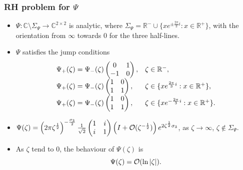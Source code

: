 \documentclass[11pt,fleqn]{article}
\numberwithin{equation}{section}
\def\bigO{{\cal O}}
\begin{document}
\subsubsection*{RH problem for $\Psi$}

\begin{itemize}
\item[(a)] $\Psi : \mathbb{C} \setminus \Sigma_{\Psi} \to \mathbb{C}^{2\times 2}$ is analytic, where $\Sigma_{\Psi} = \mathbb{R}^{-} \cup \{ xe^{\pm\frac{2\pi }{3}i} : x \in \mathbb{R}^{+} \}$, with the orientation from $\infty$ towards $0$ for the three half-lines.
\item[(b)] $\Psi$ satisfies the jump conditions
\begin{equation*}
\begin{array}{l l}
\Psi_{+}(\zeta) = \Psi_{-}(\zeta) \begin{pmatrix}
0 & 1 \\ -1 & 0
\end{pmatrix}, & \zeta \in \mathbb{R}^{-}, \\

\Psi_{+}(\zeta) = \Psi_{-}(\zeta) \begin{pmatrix}
1 & 0 \\ 1 & 1
\end{pmatrix}, & \zeta \in \{ xe^{\frac{2\pi }{3}i} : x \in \mathbb{R}^{+} \}, \\

\Psi_{+}(\zeta) = \Psi_{-}(\zeta) \begin{pmatrix}
1 & 0 \\ 1 & 1
\end{pmatrix}, & \zeta \in \{ xe^{-\frac{2\pi}{3}i} : x \in \mathbb{R}^{+} \}. \\
\end{array}
\end{equation*}
\item[(c)] $\Psi(\zeta) = \left( 2\pi \zeta^{\frac{1}{2}} \right)^{-\frac{\sigma_{3}}{2}} \frac{1}{\sqrt{2}} \begin{pmatrix}1&i\\i&1\end{pmatrix}\left(
I+\bigO (\zeta^{-\frac{1}{2}})\right) e^{2\zeta^{\frac{1}{2}}\sigma_{3}}$, \quad as $\zeta \to \infty$, $\zeta \notin \Sigma_{\Psi}$.
\item[(d)] As $\zeta$ tend to 0, the behaviour of $\Psi(\zeta)$ is
\begin{equation}\label{Psi local}
\Psi(\zeta) = \bigO (\ln |\zeta| ).
\end{equation}
\end{itemize}
\end{document}
